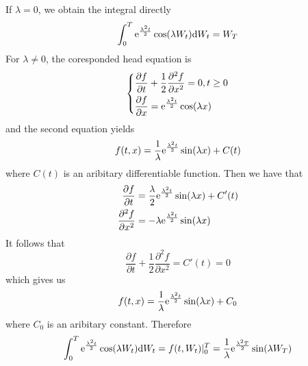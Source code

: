 \documentclass{homework}
\begin{document}
\begin{subproblem}[(\alph*)]
        \item
        If $\lambda=0$, we obtain the integral directly
        \newcommand{\thisf}[1]{\e^{\frac{\lambda^2t}2}\cos(\lambda #1)}
        \[\int_0^T\thisf{W_t}\diff W_t=W_T\]
        For $\lambda\neq 0$,
        the coresponded head equation is
        \[\left\{\begin{aligned}
            &\frac{\partial f}{\partial t}+\frac{1}{2}\frac{\partial^2 f}{\partial x^2}=0,t\geq 0\\
            &\frac{\partial f}{\partial x}=\thisf{x}
        \end{aligned}\right.\]
        and the second equation yields
        \[f(t,x)=\frac{1}{\lambda}\mathrm e^{\frac{\lambda^2t}{2}}\sin(\lambda x)+C(t)\]
        where $C(t)$ is an aribitary differentiable function. Then we have that
        \[\begin{aligned}
            \frac{\partial f}{\partial t}
            &=\frac{\lambda}{2}\mathrm e^{\frac{\lambda^2t}{2}}\sin(\lambda x)+C'(t)\\
            \frac{\partial^2 f}{\partial x^2}
            &=-\lambda\mathrm e^{\frac{\lambda^2t}{2}}\sin(\lambda x)\\
        \end{aligned}\]
        It follows that
        \[\frac{\partial f}{\partial t}+\frac{1}{2}\frac{\partial^2 f}{\partial x^2}
        =C'(t)=0\]
        which gives us
        \[f(t,x)=\frac{1}{\lambda}\mathrm e^{\frac{\lambda^2t}{2}}\sin(\lambda x)+C_0\]
        where $C_0$ is an aribitary constant.
        Therefore
        \[\int_0^T\thisf{W_t}\diff W_t=f(t,W_t)|_0^T
        =\frac{1}{\lambda}\e^{\frac{\lambda^2T}{2}}\sin(\lambda W_T)\]


\end{subproblem}
\end{document}
